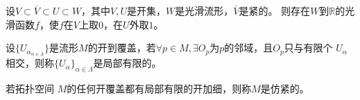 \documentclass{ctexart}
\newif\ifpreface
\begin{document}
\large
\setlength{\baselineskip}{1.2em}
\ifpreface

\else
\maketitle
\fi
{}
\begin{problem}
  设\(V \subset \overline{V} \subset U \subset W \)，其中\(V,U \)是开集，\(W \)是光滑流形，\(\overline{V}  \)是紧的。
  则存在\(W \)到\(\mathbb{R} \)的光滑函数\(f \)，使\(f \)在\(V \)上取\(0 \)，在\(U \)外取\(1 \)。
\end{problem}

\begin{definition}\label{def:local_finite}
  设\(\{U_{\alpha}_{\alpha \in \Lambda}\} \)是流形\(M \)的开到覆盖，若\(\forall p \in M,\exists O_p \)为\(p \)的邻域，且\(O_p \)只与有限个 \(U_{\alpha} \)相交，则称\(\{U_\alpha\}_{\alpha \in \Lambda} \)是局部有限的。
\end{definition}

\begin{definition}\label{def:仿紧}
  若拓扑空间 \(M \)的任何开覆盖都有局部有限的开加细，则称\(M \)是仿紧的。
\end{definition}
\end{document}
